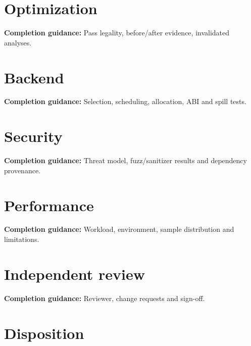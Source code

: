 \documentclass[10pt,letterpaper]{article}
\begin{document}
\section{Optimization}
\textbf{Completion guidance:} Pass legality, before/after evidence, invalidated analyses.\par\medskip{}
\section{Backend}
\textbf{Completion guidance:} Selection, scheduling, allocation, ABI and spill tests.\par\medskip{}
\section{Security}
\textbf{Completion guidance:} Threat model, fuzz/sanitizer results and dependency provenance.\par\medskip{}
\section{Performance}
\textbf{Completion guidance:} Workload, environment, sample distribution and limitations.\par\medskip{}
\section{Independent review}
\textbf{Completion guidance:} Reviewer, change requests and sign-off.\par\medskip{}
\section{Disposition}
\end{document}
